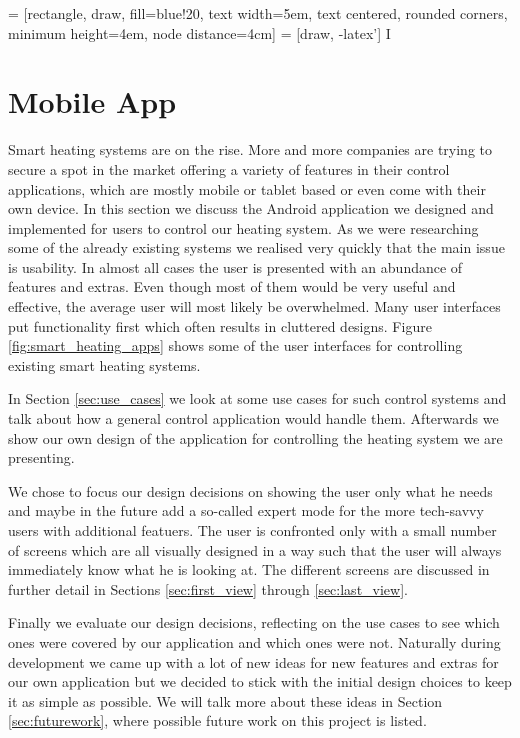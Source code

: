 
 = [rectangle, draw, fill=blue!20, 
    text width=5em, text centered, rounded corners, minimum height=4em, node distance=4cm]
 = [draw, -latex']
I
\chapter{Mobile App}
\label{sec:mobile_app}

Smart heating systems are on the rise. More and more companies are trying to secure a spot in the market offering a variety of features in their control applications, which are mostly mobile or tablet based or even come with their own device. In this section we discuss the Android application we designed and implemented for users to control our heating system. As we were researching some of the already existing systems we realised very quickly that the main issue is usability. In almost all cases the user is presented with an abundance of features and extras. Even though most of them would be very useful and effective, the average user will most likely be overwhelmed. Many user interfaces put functionality first which often results in cluttered designs. Figure \ref{fig:smart_heating_apps} shows some of the user interfaces for controlling existing smart heating systems.

In Section \ref{sec:use_cases} we look at some use cases for such control systems and talk about how a general control application would handle them. Afterwards we show our own design of the application for controlling the heating system we are presenting.

We chose to focus our design decisions on showing the user only what he needs and maybe in the future add a so-called expert mode for the more tech-savvy users with additional featuers. The user is confronted only with a small number of screens which are all visually designed in a way such that the user will always immediately know what he is looking at. The different screens are discussed in further detail in Sections \ref{sec:first_view} through \ref{sec:last_view}.

Finally we evaluate our design decisions, reflecting on the use cases to see which ones were covered by our application and which ones were not. Naturally during development we came up with a lot of new ideas for new features and extras for our own application but we decided to stick with the initial design choices to keep it as simple as possible. We will talk more about these ideas in Section \ref{sec:futurework}, where possible future work on this project is listed.

